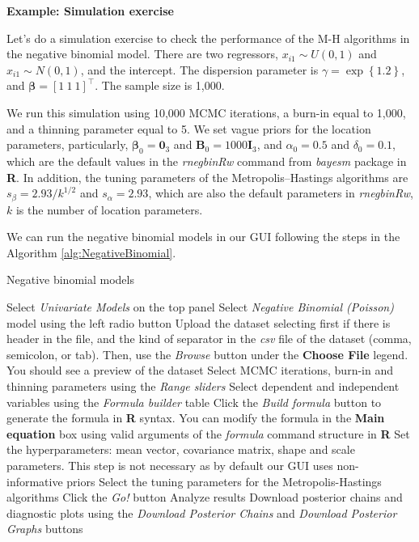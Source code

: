 \textbf{Example: Simulation exercise}

Let's do a simulation exercise to check the performance of the M-H algorithms in the negative binomial model. There are two regressors, $x_{i1}\sim U(0,1)$ and $x_{i1}\sim N(0,1)$, and the intercept. The dispersion parameter is $\gamma=\exp\left\{1.2\right\}$, and $\bm{\beta}=\left[1 \ 1 \ 1\right]^{\top}$. The sample size is 1,000.

We run this simulation using 10,000 MCMC iterations, a burn-in  equal to 1,000, and a thinning parameter equal to 5. We set vague priors for the location parameters, particularly,  $\bm{\beta}_0=\bm{0}_{3}$ and $\bm{B}_0=1000\bm{I}_{3}$, and $\alpha_0=0.5$ and $\delta_0=0.1$, which are the default values in the \textit{rnegbinRw} command from \textit{bayesm} package in \textbf{R}. In addition, the tuning parameters of the Metropolis--Hastings algorithms are $s_{\beta}=2.93/k^{1/2}$ and $s_{\alpha}=2.93$, which are also the default parameters in \textit{rnegbinRw}, $k$ is the number of location parameters.

We can run the negative binomial models in our GUI following the steps in the Algorithm \ref{alg:NegativeBinomial}.

\begin{algorithm}[h!]
	\caption{Negative binomial models}\label{alg:NegativeBinomial}
	\begin{algorithmic}[1]  		 			
		\State Select \textit{Univariate Models} on the top panel
		\State Select \textit{Negative Binomial (Poisson)} model using the left radio button
		\State Upload the dataset selecting first if there is header in the file, and the kind of separator in the \textit{csv} file of the dataset (comma, semicolon, or tab). Then, use the \textit{Browse} button under the \textbf{Choose File} legend. You should see a preview of the dataset
		\State Select MCMC iterations, burn-in and thinning parameters using the \textit{Range sliders}
		\State Select dependent and independent variables using the \textit{Formula builder} table
		\State Click the \textit{Build formula} button to generate the formula in \textbf{R} syntax. You can modify the formula in the \textbf{Main equation} box using valid arguments of the \textit{formula} command structure in \textbf{R}
		\State Set the hyperparameters: mean vector, covariance matrix, shape and scale parameters. This step is not necessary as by default our GUI uses non-informative priors
		\State Select the tuning parameters for the Metropolis-Hastings algorithms 
		\State Click the \textit{Go!} button
		\State Analyze results
		\State Download posterior chains and diagnostic plots using the \textit{Download Posterior Chains} and \textit{Download Posterior Graphs} buttons
	\end{algorithmic} 
\end{algorithm}

